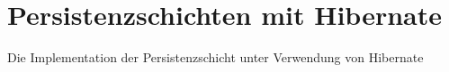 \section{Persistenzschichten mit Hibernate} \label{sec:impl-Persistenzschichten}

Die Implementation der Persistenzschicht unter Verwendung von Hibernate



















\label{sec:impl-Persistenzschichten-ende}